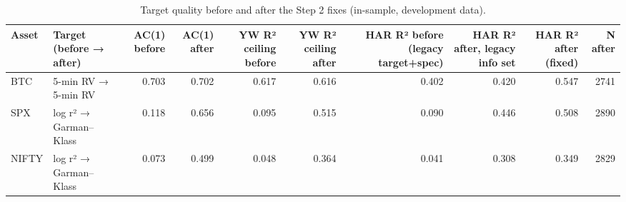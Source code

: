 \begin{table}
\caption{Target quality before and after the Step 2 fixes (in-sample, development data).}
\label{tab:target_quality_v2}
\begin{tabular}{llrrrrrrrr}
\toprule
Asset & Target (before → after) & AC(1) before & AC(1) after & YW R² ceiling before & YW R² ceiling after & HAR R² before (legacy target+spec) & HAR R² after, legacy info set & HAR R² after (fixed) & N after \\
\midrule
BTC & 5-min RV → 5-min RV & 0.703 & 0.702 & 0.617 & 0.616 & 0.402 & 0.420 & 0.547 & 2741 \\
SPX & log r² → Garman–Klass & 0.118 & 0.656 & 0.095 & 0.515 & 0.090 & 0.446 & 0.508 & 2890 \\
NIFTY & log r² → Garman–Klass & 0.073 & 0.499 & 0.048 & 0.364 & 0.041 & 0.308 & 0.349 & 2829 \\
\bottomrule
\end{tabular}
\end{table}
